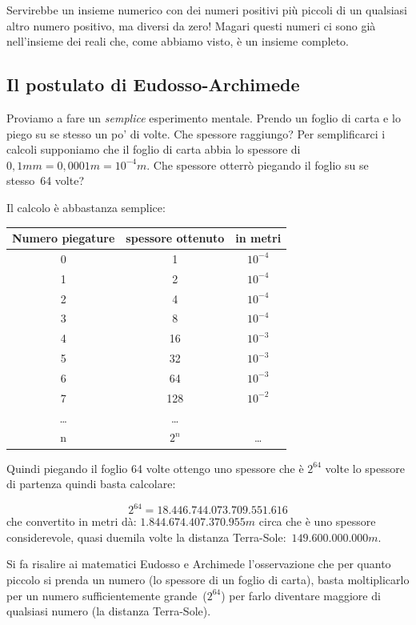 Servirebbe un insieme numerico con dei numeri positivi più piccoli di un 
qualsiasi altro numero positivo, ma diversi da zero! Magari questi numeri ci 
sono già nell'insieme dei reali che, come abbiamo visto, è un insieme completo.

\subsection{Il postulato di Eudosso-Archimede}
\label{subsec:insnum_eudossoarchimede}

Proviamo a fare un \emph{semplice} esperimento mentale. Prendo un foglio di 
carta e lo piego su se stesso un po' di volte. Che spessore raggiungo?
Per semplificarci i calcoli supponiamo che il foglio di carta abbia lo spessore 
di $0,1mm = 0,0001m = 10^{-4}m$. 
Che spessore otterrò piegando il foglio su se stesso~64 volte?

Il calcolo è abbastanza semplice:

\begin{center}
 \begin{tabular}{ccc}
\toprule
Numero piegature & spessore ottenuto & in metri\\
\midrule
0 & 1 & $10^{-4}$\\
1 & 2 & $10^{-4}$\\
2 & 4 & $10^{-4}$\\
3 & 8 & $10^{-4}$\\
4 & 16 & $10^{-3}$\\
5 & 32 & $10^{-3}$\\
6 & 64 & $10^{-3}$\\
7 & 128 & $10^{-2}$\\
\ldots& \ldots\\
n & $2^n$ & \ldots\\
\bottomrule
\end{tabular}
\end{center}

Quindi piegando il foglio 64 volte ottengo uno spessore che è $2^{64}$ volte lo 
spessore di partenza quindi basta calcolare:

\[2^{64} = 18.446.744.073.709.551.616\]
che convertito in metri dà: $1.844.674.407.370.955m$ circa che è uno spessore 
considerevole, quasi duemila volte la distanza Terra-Sole:~$149.600.000.000m$.

Si fa risalire ai matematici Eudosso e Archimede l'osservazione che per quanto 
piccolo si prenda un numero (lo spessore di un foglio di carta), basta 
moltiplicarlo per un numero sufficientemente grande~($2^{64}$) per farlo 
diventare maggiore di qualsiasi numero (la distanza Terra-Sole).

